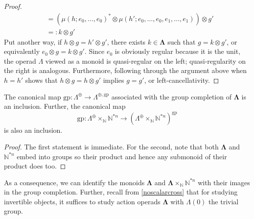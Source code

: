 \documentclass{amsbook} %
\newcommand{\ML}{\mathbf{\Lambda}}
\newcommand{\LL}{\Lambda}
\newcommand{\gp}{\mathrm{gp}}
\numberwithin{section}{chapter}
\begin{document}
\begin{proof}
\begin{align*}
		&= \left( \mu(h; e_0, \ldots, e_0)^* \otimes \mu(h'; e_0, \ldots, e_0, e_1, \ldots, e_1) \right) \otimes g' \\
		&=: k \otimes g'
	\end{align*}
Put another way, if $h \otimes g = h' \otimes g'$, there exists $k \in \ML$ such that $g = k \otimes g'$, or equivalently $e_0 \otimes g = k \otimes g'$. Since $e_0$ is obviously regular because it is the unit, the operad $\LL$ viewed as a monoid is quasi-regular on the left; quasi-regularity on the right is analogous. Furthermore, following through the argument above when $h = h'$ shows that $h \otimes g = h \otimes g'$ implies $g = g'$, or left-cancellativity.
\end{proof}

\begin{cor} \label{gpcompin} The canonical map $\gp \colon \Lambda^{\oplus} \rightarrow \Lambda^{\oplus, \gp}$ associated with the group completion of $\ML$ is an inclusion. Further, the canonical map 
  \[
    \gp \colon \Lambda^{\oplus} \times_{\mathbb{N}} \mathbb{N}^{\ast n} \rightarrow (\Lambda^{\oplus} \times_{\mathbb{N}} \mathbb{N}^{\ast n})^{\gp}
  \]
is also an inclusion.
\end{cor}
\begin{proof}
The first statement is immediate. For the second, note that both $\ML$ and $\mathbb{N}^{\ast n}$ embed into groups so their product and hence any submonoid of their product does too.
\end{proof}

As a consequence, we can identify the monoids $\ML$ and $\ML\times_{\mathbb{N}} \mathbb{N}^{\ast n}$ with their images in the group completion. Further, recall from \cref{noscalarcross} that for studying invertible objects, it suffices to study action operads $\ML$ with $\Lambda(0)$ the trivial group.
\end{document}
